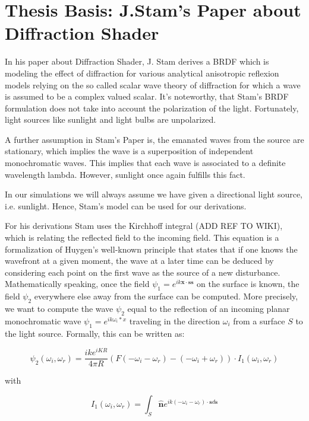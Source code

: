 \section{Thesis Basis: J.Stam's Paper about Diffraction Shader}
In his paper about Diffraction Shader, J. Stam derives a BRDF which is modeling the effect of diffraction for various analytical anisotropic reflexion models relying on the so called scalar wave theory of diffraction for which a wave is assumed to be a complex valued scalar. 
It's noteworthy, that Stam's BRDF formulation does not take into account the polarization of the light. Fortunately, light sources like sunlight and light bulbs are unpolarized. 

A further assumption in Stam's Paper is, the emanated waves from the source are stationary, which implies the wave is a superposition of independent monochromatic waves. This implies that each wave is associated to a definite wavelength lambda. However, sunlight once again fulfills this fact.

In our simulations we will always assume we have given a directional light source, i.e. sunlight. Hence, Stam's model can be used for our derivations.

For his derivations Stam uses the Kirchhoff integral (ADD REF TO WIKI), which is relating the reflected field to the incoming field. This equation is a formalization of Huygen’s well-known principle that states that if one knows the wavefront at a given moment, the wave at a later time can be deduced by considering each point on the first wave as the source of a new disturbance. Mathematically speaking, once the field  $\psi_1 =  e^{ik\mathbf{x} \cdot \mathbf{s}\mathbf{s}}$ on the surface is known, the field $\psi_2$ everywhere else away from the surface can be computed.
More precisely, we want to compute the wave $\psi_2$ equal to the reflection of an incoming planar monochromatic wave $\psi_1 = e^{ik \omega_i * x}$  traveling in the direction $\omega_i$ from a surface $S$ to the light source. Formally, this can be written as:

\begin{equation}
\psi_{2}(\omega_i, \omega_r) = \frac{i k e^{i K R}}{4 \pi R} (F(-\omega_i-\omega_r)-(-\omega_i+\omega_r)) \cdot I_{1}(\omega_i, \omega_r) 
\label{eq:kirchhoff}
\end{equation}

with

\begin{equation}
I_{1}(\omega_i, \omega_r) = \int_{S} \hat{\mathbf{n}} e^{ik(-\omega_i-\omega_{r}) \cdot \mathbf{s} d\mathbf{s}}
\label{eq:IBase}
\end{equation}

